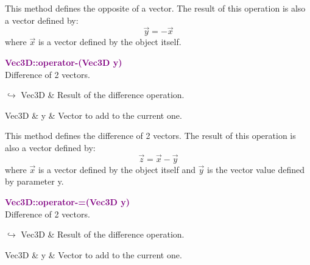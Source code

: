 This method defines the opposite of a vector.
The result of this operation is also a vector defined by:
\begin{equation*}
\overrightarrow{y} = -\overrightarrow{x}
\end{equation*}
where $\overrightarrow{x}$ is a vector defined by the object itself.

\textcolor{purple}{\textbf{Vec3D::operator-(Vec3D y)}}\label{Vec3D::operator-(Vec3D y)}\\
Difference of 2 vectors.\vspace*{-0.5em}
\begin{tcolorbox}[grow to left by=-1cm, width=\textwidth-1cm,myArgs,tabularx={l|R}]
$\hookrightarrow$ Vec3D & Result of the difference operation.
\end{tcolorbox}

\begin{tcolorbox}[width=\textwidth,myArgs,tabularx={ll|R}]
Vec3D & y & Vector to add to the current one.
\end{tcolorbox}

This method defines the difference of 2 vectors.
The result of this operation is also a vector defined by:
\begin{equation*}
\overrightarrow{z} = \overrightarrow{x} - \overrightarrow{y}
\end{equation*}
where $\overrightarrow{x}$ is a vector defined by the object itself and $\overrightarrow{y}$ is the vector value defined by parameter y.

\textcolor{purple}{\textbf{Vec3D::operator-=(Vec3D y)}}\label{Vec3D::operator-=(Vec3D y)}\\
Difference of 2 vectors.\vspace*{-0.5em}
\begin{tcolorbox}[grow to left by=-1cm, width=\textwidth-1cm,myArgs,tabularx={l|R}]
$\hookrightarrow$ Vec3D & Result of the difference operation.
\end{tcolorbox}

\begin{tcolorbox}[width=\textwidth,myArgs,tabularx={ll|R}]
Vec3D & y & Vector to add to the current one.
\end{tcolorbox}

